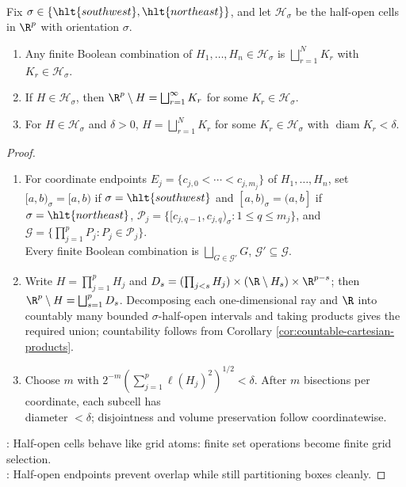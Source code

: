 \begin{proposition} \label{prop:half-open-cell-calculus-and-subdivision} \\
Fix $\sigma\in\{\hlt{southwest},\hlt{northeast}\}$, and let $\mathcal{H}_\sigma$ be the half-open cells in $\R^p$ with orientation $\sigma$.
\begin{enumerate}[label=(\roman*)]
\setlength{\itemsep}{0pt}
\item Any finite Boolean combination of $H_1,\ldots,H_n\in\mathcal{H}_\sigma$ is $\bigsqcup_{r=1}^{N}K_r$ with $K_r\in\mathcal{H}_\sigma$.
\item If $H\in\mathcal{H}_\sigma$, then $\R^p\setminus H=\bigsqcup_{r=1}^{\infty}K_r$ for some $K_r\in\mathcal{H}_\sigma$.
\item For $H\in\mathcal{H}_\sigma$ and $\delta>0$, $H=\bigsqcup_{r=1}^{N}K_r$ for some $K_r\in\mathcal{H}_\sigma$ with $\operatorname{diam}K_r<\delta$.
\end{enumerate}
\begin{proof}
\begin{enumerate}[label=(\roman*)]
\setlength{\itemsep}{0pt}
\item For coordinate endpoints $E_j=\{c_{j,0}<\cdots<c_{j,m_j}\}$ of $H_1,\ldots,H_n$, set $[a,b)_\sigma=[a,b)$ if $\sigma=\hlt{southwest}$ and $[a,b)_\sigma=(a,b]$ if $\sigma=\hlt{northeast}$, $\mathcal{P}_j=\{[c_{j,q-1},c_{j,q})_\sigma:1\leq q\leq m_j\}$, and $\mathcal{G}=\{\prod_{j=1}^{p}P_j:P_j\in\mathcal{P}_j\}$.\\
Every finite Boolean combination is $\bigsqcup_{G\in\mathcal{G}'}G$, $\mathcal{G}'\subseteq\mathcal{G}$.
\item Write $H=\prod_{j=1}^{p}H_j$ and $D_s=(\prod_{j<s}H_j)\times(\R\setminus H_s)\times\R^{p-s}$; then $\R^p\setminus H=\bigsqcup_{s=1}^{p}D_s$. Decomposing each one-dimensional ray and $\R$ into countably many bounded $\sigma$-half-open intervals and taking products gives the required union; countability follows from Corollary \ref{cor:countable-cartesian-products}.
\item Choose $m$ with $2^{-m}(\sum_{j=1}^{p}\ell(H_j)^2)^{1/2}<\delta$. After $m$ bisections per coordinate, each subcell has\\
diameter $<\delta$; disjointness and volume preservation follow coordinatewise.
\end{enumerate}
: Half-open cells behave like grid atoms: finite set operations become finite grid selection.\\
: Half-open endpoints prevent overlap while still partitioning boxes cleanly.
\end{proof}
\end{proposition}

